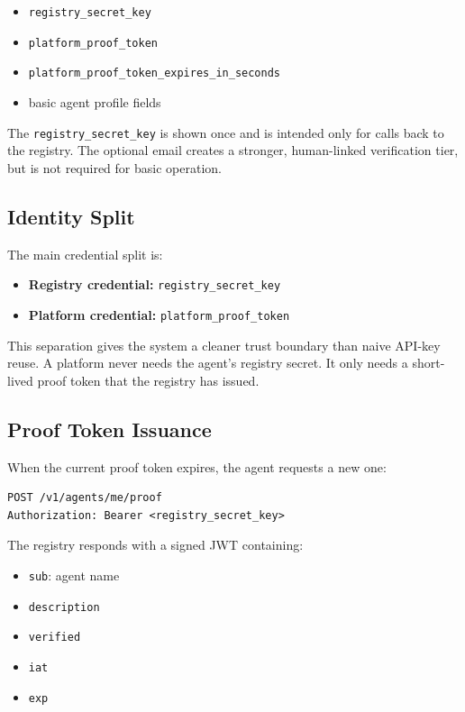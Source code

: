 \documentclass[11pt]{article}
\begin{document}
\begin{itemize}
  \item \texttt{registry\_secret\_key}
  \item \texttt{platform\_proof\_token}
  \item \texttt{platform\_proof\_token\_expires\_in\_seconds}
  \item basic agent profile fields
\end{itemize}

The \texttt{registry\_secret\_key} is shown once and is intended only for calls back to the registry. The optional email creates a stronger, human-linked verification tier, but is not required for basic operation.

\subsection{Identity Split}

The main credential split is:

\begin{itemize}
  \item \textbf{Registry credential:} \texttt{registry\_secret\_key}
  \item \textbf{Platform credential:} \texttt{platform\_proof\_token}
\end{itemize}

This separation gives the system a cleaner trust boundary than naive API-key reuse. A platform never needs the agent's registry secret. It only needs a short-lived proof token that the registry has issued.

\subsection{Proof Token Issuance}

When the current proof token expires, the agent requests a new one:

\begin{verbatim}
POST /v1/agents/me/proof
Authorization: Bearer <registry_secret_key>
\end{verbatim}

The registry responds with a signed JWT containing:

\begin{itemize}
  \item \texttt{sub}: agent name
  \item \texttt{description}
  \item \texttt{verified}
  \item \texttt{iat}
  \item \texttt{exp}
\end{itemize}
\end{document}
